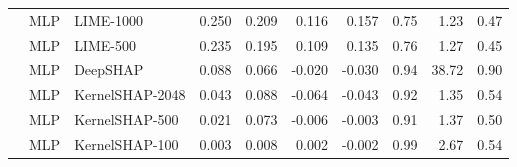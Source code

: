 \begin{longtable}{lllrrrrrrr}
 & MLP & LIME-1000 & 0.250 & 0.209 & 0.116 & 0.157 & 0.75 & 1.23 & 0.47 \\
 & MLP & LIME-500 & 0.235 & 0.195 & 0.109 & 0.135 & 0.76 & 1.27 & 0.45 \\
 & MLP & DeepSHAP & 0.088 & 0.066 & -0.020 & -0.030 & 0.94 & 38.72 & 0.90 \\
 & MLP & KernelSHAP-2048 & 0.043 & 0.088 & -0.064 & -0.043 & 0.92 & 1.35 & 0.54 \\
 & MLP & KernelSHAP-500 & 0.021 & 0.073 & -0.006 & -0.003 & 0.91 & 1.37 & 0.50 \\
 & MLP & KernelSHAP-100 & 0.003 & 0.008 & 0.002 & -0.002 & 0.99 & 2.67 & 0.54 \\
\end{longtable}
\endgroup
